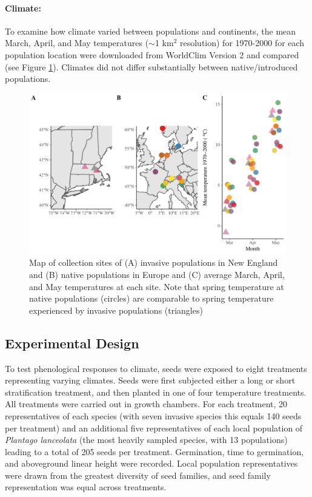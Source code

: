 \documentclass[12pt]{article}\usepackage[]{graphicx}\usepackage[]{color}
\begin{document}
	\paragraph{Climate:} 
	To examine how climate varied between populations and continents, the mean March, April, and May temperatures ($\sim$1 km$^2$ resolution) for 1970-2000 for each population location were downloaded from WorldClim Version 2 \parencite{Fick2017}  and compared (see Figure \ref{fig:sites}). Climates did not differ substantially between native/introduced populations.  
	
	
	\begin{figure} 
		\centering
		\includegraphics[width=1 \textwidth,trim=0cm 0cm 0cm 0cm, angle=0, scale=.9, origin=c,clip=false]{sampling_sites}
		\caption{Map of collection sites of (A) invasive populations in New England and (B) native populations in Europe and (C) average March, April, and May temperatures at each site. Note that spring temperature at native populations (circles) are comparable to spring temperature experienced by invasive populations (triangles)} 
		\label{fig:sites}
	\end{figure}


	\subsection{Experimental Design} 
	To test phenological responses to climate, seeds were exposed to eight treatments representing varying climates. Seeds were first subjected either a long or short stratification treatment, and then planted in one of four temperature treatments. All treatments were carried out in growth chambers. For each treatment, 20 representatives of each species (with seven invasive species this equals 140 seeds per treatment) and an additional five representatives of each local population of \textit{Plantago lanceolata} (the most heavily sampled species, with 13 populations) leading to a total of 205 seeds per treatment. Germination, time to germination, and aboveground linear height were recorded. Local population representatives were drawn from the greatest diversity of seed families, and seed family representation was equal across treatments. 
	
\end{document}
